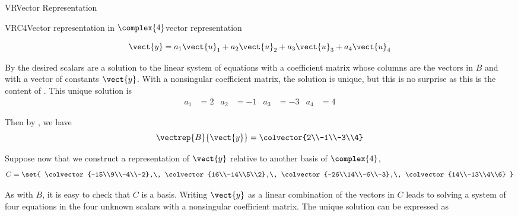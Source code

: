 \begin{subsect}{VR}{Vector Representation}
\begin{example}{VRC4}{Vector representation in $\complex{4}$}{vector representation}
\begin{para}
%
\begin{equation*}
\vect{y}=a_1\vect{u}_1+a_2\vect{u}_2+a_3\vect{u}_3+a_4\vect{u}_4
\end{equation*}
\end{para}
%
\begin{para}By  the desired scalars are a solution to the linear system of equations with a coefficient matrix whose columns are the vectors in $B$ and with a vector of constants $\vect{y}$.  With a nonsingular coefficient matrix, the solution is unique, but this is no surprise as this is the content of .  This unique solution is
%
\begin{align*}
a_1&=2&a_2&=-1&a_3&=-3&a_4&=4
\end{align*}
\end{para}
%
\begin{para}Then by , we have
%
\begin{equation*}
\vectrep{B}{\vect{y}}=\colvector{2\\-1\\-3\\4}
\end{equation*}
\end{para}
%
\begin{para}Suppose now that we construct a representation of $\vect{y}$ relative to another basis of $\complex{4}$,
%
\begin{equation*}
C=\set{
\colvector{-15\\9\\-4\\-2},\,
\colvector{16\\-14\\5\\2},\,
\colvector{-26\\14\\-6\\-3},\,
\colvector{14\\-13\\4\\6}
}
\end{equation*}
\end{para}
%
\begin{para}As with $B$, it is easy to check that $C$ is a basis.  Writing $\vect{y}$ as a linear combination of the vectors in $C$ leads to solving a system of four equations in the four unknown scalars with a nonsingular coefficient matrix.  The unique solution can be expressed as
%
\begin{equation*}

\end{equation*}
\end{para}
\end{example}
\end{subsect}
